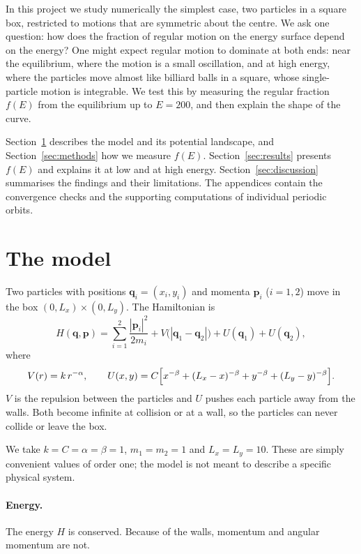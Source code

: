 \documentclass[11pt,a4paper]{article}
\newcommand{\q}{\mathbf{q}}
\newcommand{\p}{\mathbf{p}}
\begin{document}
In this project we study numerically the simplest case, two particles in a
square box, restricted to motions that are symmetric about the centre. We ask
one question: how does the fraction of regular motion on the energy surface
depend on the energy? One might expect regular motion to dominate at both
ends: near the equilibrium, where the motion is a small oscillation, and at
high energy, where the particles move almost like billiard balls in a square,
whose single-particle motion is integrable. We test this by measuring the
regular fraction $f(E)$ from the equilibrium up to $E=200$, and then explain
the shape of the curve.

Section~\ref{sec:model} describes the model and its potential landscape, and
Section~\ref{sec:methods} how we measure $f(E)$. Section~\ref{sec:results}
presents $f(E)$ and explains it at low and at high energy.
Section~\ref{sec:discussion} summarises the findings and their limitations.
The appendices contain the convergence checks and the supporting computations
of individual periodic orbits.

\section{The model}\label{sec:model}

Two particles with positions $\q_i=(x_i,y_i)$ and momenta $\p_i$ ($i=1,2$)
move in the box $(0,L_x)\times(0,L_y)$. The Hamiltonian is
\begin{equation}\label{eq:H}
  H(\q,\p)=\sum_{i=1}^{2}\frac{|\p_i|^2}{2m_i}
  + V\bigl(|\q_1-\q_2|\bigr) + U(\q_1) + U(\q_2),
\end{equation}
where
\begin{equation}\label{eq:potentials}
  V(r)=k\,r^{-\alpha},\qquad
  U(x,y)=C\Bigl[x^{-\beta}+(L_x-x)^{-\beta}+y^{-\beta}+(L_y-y)^{-\beta}\Bigr].
\end{equation}
$V$ is the repulsion between the particles and $U$ pushes each particle away
from the walls. Both become infinite at collision or at a wall, so the
particles can never collide or leave the box.

We take $k=C=\alpha=\beta=1$, $m_1=m_2=1$ and $L_x=L_y=10$. These are simply
convenient values of order one; the model is not meant to describe a specific
physical system.

\paragraph{Energy.} The energy $H$ is conserved. Because of the walls,
momentum and angular momentum are not.
\end{document}
